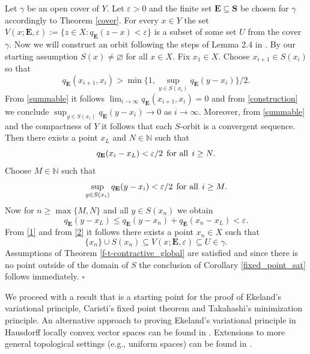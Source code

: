 \documentclass{article}
\renewcommand{\emptyset}{\varnothing}
\def\text#1{\,\;\hbox{#1}\;\,}
\newcommand{\N}{\mathbb{N}}
\renewenvironment{proof}
         {\begin{trivlist}\item[
         {\bf Proof.}]}{{\hfill $\square$} \end{trivlist}}
\begin{document}
\begin{proof}

Let $\gamma$ be an open cover of $Y$. Let $\varepsilon > 0$ and the finite set
$\mathbf{E} \subseteq \mathbf{S}$ be chosen for $\gamma$ accordingly to Theorem \ref{cover}. For every
$x \in Y$ the set $V (x;\mathbf{E}, \varepsilon):=\{z \in X: q_{\mathbf{E}}(z-x)<\varepsilon\}$ is a subset of some set $U$ from the cover $\gamma$. Now we will construct an orbit following the steps of Lemma 2.4 in \cite{IKZ}. By our starting assumption $S(x) \neq \emptyset$ for all $x \in X$. Fix $x_1 \in X$. Choose $x_{i+1} \in S(x_i)$ so that \begin{equation}\label{construction}
            q_{\mathbf{E}}(x_{i+1},x_i) > \min\{1, \sup_{y \in S(x_i)}q_{\mathbf{E}}(y-x_i)\}/2.
        \end{equation}
From \ref{summable} it follows $\lim_{i \rightarrow \infty} q_{\mathbf{E}}(x_{i+1},x_i)=0$ and from \ref{construction} we conclude $\sup_{y \in S(x_i)}q_{\mathbf{E}}(y-x_i) \rightarrow 0$ as $i \rightarrow \infty$. 
Moreover, from \ref{summable} and the compactness of $Y$ it follows that each $S$-orbit is a convergent sequence. Then there exists a point $x_L$ and $N \in \N$ such that 
\begin{equation} \label{1}
q_{\mathbf{E}}(x_{i}-x_L) < \varepsilon/2 \text{for all} i \geq N.\end{equation}
Choose $M \in \N$ such that 
\[
\sup_{y \in S(x_{i})}q_{\mathbf{E}}(y-x_{i}) < \varepsilon/2 \text{for all} i \geq M.
\]
Now for $n \geq \max\{M,N\}$
and all $y \in S(x_{n})$ we obtain
\begin{equation} \label{2}
q_{\mathbf{E}}(y-x_L) \leq q_{\mathbf{E}}(y-x_{n})+q_{\mathbf{E}}(x_{n}-x_L)<\varepsilon.
\end{equation}
From \ref{1} and from \ref{2} it follows there exists a point $x_n \in X$ such that
\[\{x_n\} \cup S(x_n) \subseteq V (x;\mathbf{E}, \varepsilon) \subseteq U \in \gamma.\]
Assumptions of Theorem \ref{f-t-contractive_global} are satisfied and since there is no point outside of the domain of $S$ the conclusion of Corollary \ref{fixed_point_sat} follows immediately.
\end{proof}
We proceed with a result that is a starting point for the proof of Ekeland's variational principle, Caristi's fixed point theorem and Takahashi's minimization principle. An alternative approach to proving Ekeland's variational principle in Hausdorff locally convex vector spaces can be found in \cite{Hammel_lc}. Extensions to more general topological settings (e.g., uniform spaces) can be found in \cite{Hammel_un}.
\end{document}
